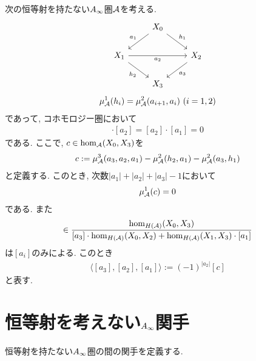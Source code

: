 \documentclass[uplatex, a4paper, 14Q, dvipdfmx]{jsarticle}
\begin{document}
\begin{remark}
  次の恒等射を持たない$A_{\infty}$圏$\mathcal{A}$を考える. 
  \[\begin{tikzcd}
    & {X_0} \\
    {X_1} && {X_2} \\
    & {X_3}
    \arrow["{a_1}"', from=1-2, to=2-1]
    \arrow["{a_2}"', from=2-1, to=2-3]
    \arrow["{a_3}", from=2-3, to=3-2]
    \arrow["{h_1}", from=1-2, to=2-3]
    \arrow["{h_2}"', from=2-1, to=3-2]
  \end{tikzcd}\]
  \begin{align*}
    \mu^1_{\mathcal{A}}(h_i) = \mu^2_{\mathcal{A}}(a_{i+1},a_i) ~ (i=1,2)
  \end{align*}
  であって, コホモロジー圏において 
  \begin{align*}
    [a_3] \cdot [a_2] = [a_2] \cdot [a_1] = 0 
  \end{align*}
  である. 
  ここで, $c \in \hom_{\mathcal{A}}(X_0,X_3)$を
  \begin{align*}
    c := \mu^3_{\mathcal{A}}(a_3,a_2,a_1) - \mu^2_{\mathcal{A}}(h_2,a_1) - \mu^2_{\mathcal{A}}(a_3,h_1)
  \end{align*}
  と定義する.
  このとき, 次数$|a_1|+|a_2|+|a_3|-1$において
  \begin{align*}
    \mu^1_{\mathcal{A}}(c)=0
  \end{align*}
  である.
  また
  \begin{align*}
    [c] \in \frac{\hom_{H(\A)}(X_0,X_3)}{[a_3] \cdot \hom_{H(\A)}(X_0,X_2) + \hom_{H(\A)}(X_1,X_3) \cdot [a_1]}
  \end{align*}
  は$[a_i]$のみによる.
  このとき
  \begin{align*}
    \langle [a_3],[a_2],[a_1] \rangle := (-1)^{|a_2|} [c]
  \end{align*}
  と表す. 
\end{remark}

\section{恒等射を考えない\texorpdfstring{$A_{\infty}$}{Ainf}関手} \label{section_non_unital_Ainf_functor}

恒等射を持たない$A_{\infty}$圏の間の関手を定義する. 
\end{document}

